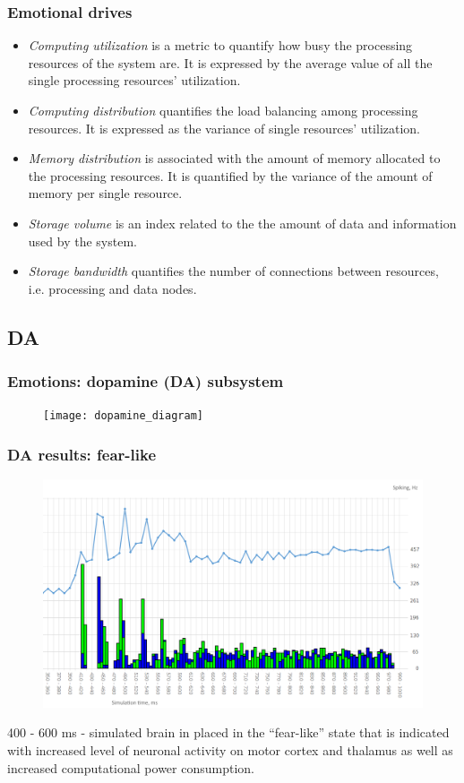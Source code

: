 \documentclass[12pt, aspectratio=169]{beamer}
\begin{document}

\begin{frame}
\frametitle{Emotional drives}
\begin{itemize}
 \item \emph{Computing utilization} is a metric to quantify how busy the processing resources of the system are. It is expressed by the average value of all the single processing resources' utilization.
 \item \emph{Computing distribution} quantifies the load balancing among processing resources. It is expressed as the variance of single resources' utilization.
 \item \emph{Memory distribution} is associated with the amount of memory allocated to the processing resources. It is quantified by the variance of the amount of memory per single resource.
 \item \emph{Storage volume} is an index related to the the amount of data and information used by the system.
 \item \emph{Storage bandwidth} quantifies the number of connections between resources, i.e. processing and data nodes.
\end{itemize}
\end{frame}

\subsection{DA}

\begin{frame}
\frametitle{Emotions: dopamine (DA) subsystem}
\begin{figure}
\texttt{[image: dopamine\_diagram]}
\end{figure}
\end{frame}


\begin{frame}
\frametitle{DA results: fear-like}
\begin{figure}
\includegraphics[width=0.6\linewidth]{resultBIG_short}
\end{figure}
400 - 600 ms - simulated brain in placed in the ``fear-like'' state that is indicated with increased level of neuronal activity on motor cortex and thalamus as well as increased computational power consumption.
\end{frame}
\end{document}
